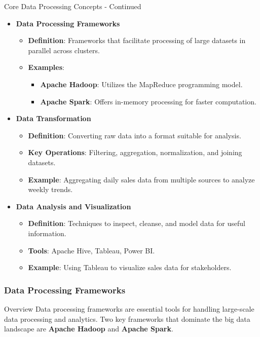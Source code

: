 \documentclass[aspectratio=169]{beamer}
\begin{document}
\begin{frame}[fragile]{Core Data Processing Concepts - Continued}
    \begin{itemize}
        \item \textbf{Data Processing Frameworks}
            \begin{itemize}
                \item \textbf{Definition}: Frameworks that facilitate processing of large datasets in parallel across clusters.
                \item \textbf{Examples}:
                    \begin{itemize}
                        \item \textbf{Apache Hadoop}: Utilizes the MapReduce programming model.
                        \item \textbf{Apache Spark}: Offers in-memory processing for faster computation.
                    \end{itemize}
            \end{itemize}

        \item \textbf{Data Transformation}
            \begin{itemize}
                \item \textbf{Definition}: Converting raw data into a format suitable for analysis.
                \item \textbf{Key Operations}: Filtering, aggregation, normalization, and joining datasets.
                \item \textbf{Example}: Aggregating daily sales data from multiple sources to analyze weekly trends.
            \end{itemize}

        \item \textbf{Data Analysis and Visualization}
            \begin{itemize}
                \item \textbf{Definition}: Techniques to inspect, cleanse, and model data for useful information.
                \item \textbf{Tools}: Apache Hive, Tableau, Power BI.
                \item \textbf{Example}: Using Tableau to visualize sales data for stakeholders.
            \end{itemize}
    \end{itemize}
\end{frame}

\begin{frame}[fragile]
    \frametitle{Data Processing Frameworks}
    \begin{block}{Overview}
        Data processing frameworks are essential tools for handling large-scale data processing and analytics. Two key frameworks that dominate the big data landscape are \textbf{Apache Hadoop} and \textbf{Apache Spark}.
    \end{block}
\end{frame}
\end{document}
